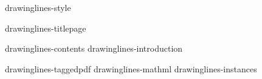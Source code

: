 

\environment drawinglines-style

\startdocument

    \component drawinglines-titlepage

    \startfrontmatter
        \component drawinglines-contents
        \component drawinglines-introduction
    \stopfrontmatter

    \startbodymatter
        \component drawinglines-taggedpdf
        \component drawinglines-mathml
        \component drawinglines-instances
    \stopbodymatter

\stopdocument

